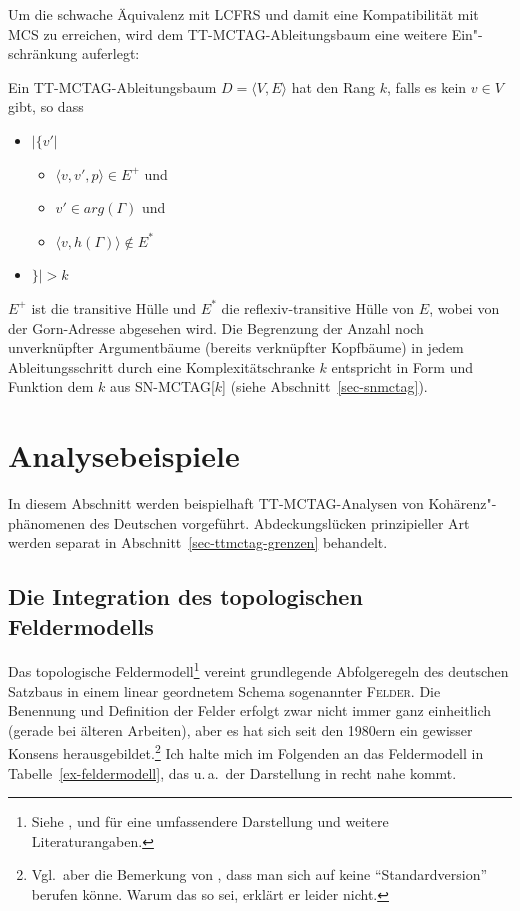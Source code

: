 Um die schwache Äquivalenz mit LCFRS und damit eine Kompatibilität mit MCS zu erreichen, wird dem TT-MCTAG-Ableitungsbaum eine weitere Ein"-schränkung auferlegt:
\begin{definition}[$k$-TT-MCTAG] Ein TT-MCTAG-Ableitungsbaum $D = \langle V,E \rangle$ hat den Rang $k$, falls es kein $v \in V$ gibt, so dass
\begin{itemize}
  \item[] $|\{ v'| $ 
  \begin{itemize}
  \item[]$\langle v,v',p\rangle \in E^+ $ und 
  \item[]$v' \in arg(\Gamma)$ und 
  \item[]$ \langle v,h(\Gamma)\rangle \not\in E^*$ 
  \end{itemize} 
  \item[]$\}|  > k$  
\end{itemize}
\end{definition}
$E^+$ ist die transitive Hülle und $E^*$ die reflexiv-transitive Hülle von $E$, wobei von der Gorn-Adresse abgesehen wird.
Die Begrenzung der Anzahl noch unverknüpfter Argumentbäume (bereits verknüpfter Kopfbäume) in jedem Ableitungsschritt durch eine Komplexitätschranke $k$ entspricht in Form und Funktion dem $k$ aus SN-MCTAG[$k$] (siehe Abschnitt~\ref{sec-snmctag}).  

\section{Analysebeispiele} \label{sec-ttmctag-beispiele}

In diesem Abschnitt werden beispielhaft TT-MCTAG-Analysen von Kohärenz"-phänomenen des Deutschen vorgeführt. Abdeckungslücken prinzipieller Art werden separat in Abschnitt~\ref{sec-ttmctag-grenzen} behandelt. 

\subsection{Die Integration des topologischen Feldermodells}\label{sec-feldermodell}

Das topologische Feldermodell\footnote{Siehe \cite{Reis:80}, \cite{Askedal:86} und \cite{Hoehle:86} für eine umfassendere Darstellung und weitere Literaturangaben.} vereint grundlegende Abfolgeregeln des deutschen Satzbaus in einem linear geordnetem Schema sogenannter \textsc{Felder}. Die Benennung und Definition der Felder erfolgt zwar nicht immer ganz einheitlich (gerade bei älteren Arbeiten), aber es hat sich seit den 1980ern ein gewisser Konsens herausgebildet.\footnote{Vgl.\ aber die Bemerkung von \citet[286]{Sternefeld:06}, dass man sich auf keine "`Standardversion"' berufen könne. Warum das so sei, erklärt er leider nicht.} Ich halte mich im Folgenden an das  Feldermodell in Tabelle~\ref{ex-feldermodell}, das u.\,a.\ der Darstellung in \citet[216ff]{Askedal:86} recht nahe kommt. 

